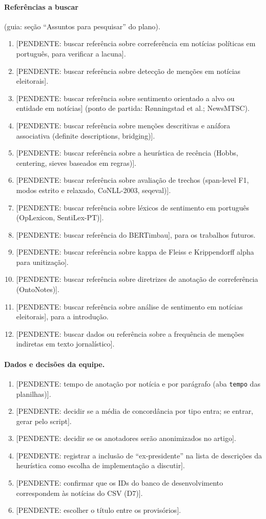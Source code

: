 \documentclass[11pt,a4paper]{article}
\newcommand{\pend}[1]{\textcolor{red!60!black}{[PENDENTE: #1]}}
\begin{document}
\paragraph{Referências a buscar} (guia: seção \enquote{Assuntos para pesquisar} do plano).
\begin{enumerate}
\item \pend{buscar referência sobre correferência em notícias políticas em português, para verificar a lacuna}.
\item \pend{buscar referência sobre detecção de menções em notícias eleitorais}.
\item \pend{buscar referência sobre sentimento orientado a alvo ou entidade em notícias} (ponto de partida: Rønningstad et al.; NewsMTSC).
\item \pend{buscar referência sobre menções descritivas e anáfora associativa (definite descriptions, bridging)}.
\item \pend{buscar referência sobre a heurística de recência (Hobbs, centering, sieves baseados em regras)}.
\item \pend{buscar referência sobre avaliação de trechos (span-level F1, modos estrito e relaxado, CoNLL-2003, seqeval)}.
\item \pend{buscar referência sobre léxicos de sentimento em português (OpLexicon, SentiLex-PT)}.
\item \pend{buscar referência do BERTimbau}, para os trabalhos futuros.
\item \pend{buscar referência sobre kappa de Fleiss e Krippendorff alpha para unitização}.
\item \pend{buscar referência sobre diretrizes de anotação de correferência (OntoNotes)}.
\item \pend{buscar referência sobre análise de sentimento em notícias eleitorais}, para a introdução.
\item \pend{buscar dados ou referência sobre a frequência de menções indiretas em texto jornalístico}.
\end{enumerate}

\paragraph{Dados e decisões da equipe.}
\begin{enumerate}[resume]
\item \pend{tempo de anotação por notícia e por parágrafo (aba \texttt{tempo} das planilhas)}.
\item \pend{decidir se a média de concordância por tipo entra; se entrar, gerar pelo script}.
\item \pend{decidir se os anotadores serão anonimizados no artigo}.
\item \pend{registrar a inclusão de \enquote{ex-presidente} na lista de descrições da heurística como escolha de implementação a discutir}.
\item \pend{confirmar que os IDs do banco de desenvolvimento correspondem às notícias do CSV (D7)}.
\item \pend{escolher o título entre os provisórios}.
\end{enumerate}
\end{document}
